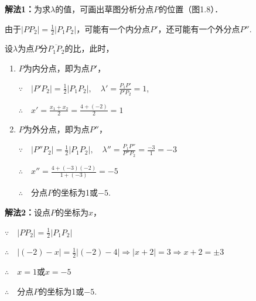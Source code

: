 \begin{solution}
    \textbf{解法1：}为求$\lambda$的值，可画出草图分析分点$P$的位置（图1.8）．
\begin{figure}[htp]
    \centering
{}

    \caption{}
\end{figure}

由于$|PP_2|=\frac{1}{2}|P_1P_2|$，可能有一个内分点$P'$，还可能有一个外分点$P''$.

设$\lambda$为点$P$分$\overline{P_1P_2}$的比，此时，
\begin{enumerate}[(1)]
    \item $P$为内分点，即为点$P'$，

$\because\quad    |P'P_2|=\frac{1}{2}|P_1P_2|, \quad \lambda'=\frac{P_1P'}{P'P_2}=1$,

$\therefore\quad x'=\frac{x_1+x_2}{2}=\frac{4+(-2)}{2}=1$

\item $P$为外分点，即为点$P''$，

$\because\quad |P''P_2|=\frac{1}{2}|P_1P_2|,\quad \lambda''=\frac{P_1P''}{P''P_2}=\frac{-3}{1}=-3$

$\therefore\quad x''=\frac{4+(-3)(-2)}{1+(-3)}=-5$

$\therefore\quad $分点$P$的坐标为1或$-5$.
\end{enumerate}

\textbf{解法2：}设点$P$的坐标为$x$，

$\because\quad |PP_2|=\frac{1}{2}|P_1P_2|$

$\therefore\quad |(-2)-x|=\frac{1}{2}|(-2)-4|\Rightarrow |x+2|=3\Rightarrow x+2=\pm 3$

$\therefore\quad x=1$或$x=-5$

$\therefore\quad $分点$P$的坐标为1或$-5$.
\end{solution}


